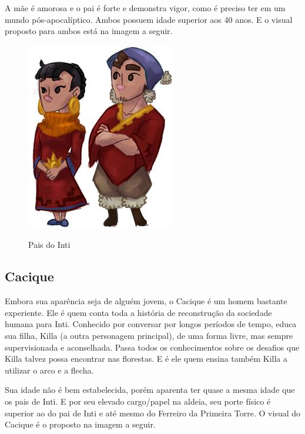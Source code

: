 \documentclass[12pt]{article}
\begin{document}
A mãe é amorosa e o pai é forte e demonstra vigor, como é preciso ter em um
mundo pós-apocalíptico. Ambos possuem idade superior aos 40 anos. E o visual
proposto para ambos está na imagem a seguir.

\begin{figure}[!htb]
    \centering
    \includegraphics[scale=0.9]{pais_do_inti.jpg}
    \label{fig:pais_do_inti}
    \caption{Pais do Inti}
\end{figure}

\newpage

\subsection{Cacique}
Embora sua aparência seja de alguém jovem, o Cacique é um homem bastante
experiente. Ele é quem conta toda a história de reconstrução da sociedade
humana para Inti. Conhecido por conversar por longos períodos de tempo, educa
sua filha, Killa (a outra personagem principal), de uma forma livre, mas sempre
supervisionada e aconselhada. Passa todos os conhecimentos sobre os desafios que
Killa talvez possa encontrar nas florestas. E é ele quem ensina também Killa a
utilizar o arco e a flecha.

Sua idade não é bem estabelecida, porém aparenta ter quase a mesma idade que os
pais de Inti. E por seu elevado cargo/papel na aldeia, seu porte físico é
superior ao do pai de Inti e até mesmo do Ferreiro da Primeira Torre. O visual
do Cacique é o proposto na imagem a seguir.
\end{document}
